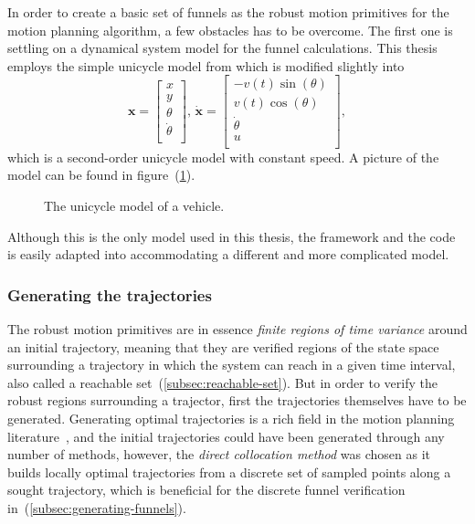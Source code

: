 In order to create a basic set of funnels as the robust motion primitives for
the \rrtfunnel{} motion planning algorithm, a few obstacles has to be overcome.
The first one is settling on a dynamical system model for the funnel
calculations. This thesis employs the simple unicycle model from
\cite[LaValle.p~613]{Lav06} which is modified slightly into
\begin{equation}
  \label{eq:model-dynamics}
  \mathbf{x} =
  \begin{bmatrix}
    x \\ y \\ \theta \\ \dot{\theta} \\
  \end{bmatrix}, \, \dot{\mathbf{x}} =
  \begin{bmatrix}
    -v(t)\sin(\theta) \\
    v(t)\cos(\theta) \\
    \dot{\theta} \\
    u \\
  \end{bmatrix},
\end{equation}
which is a second-order unicycle model with constant speed. A picture of the
model can be found in figure~(\ref{fig:second-order-unicycle}).
\begin{figure}
  \centering {}
  \caption{The unicycle model of a vehicle.}
  \label{fig:second-order-unicycle}
\end{figure}
Although this is the only model used in this thesis, the framework and the code
is easily adapted into accommodating a different and more complicated model.

\subsubsection{Generating the trajectories}

The robust motion primitives are in essence \textit{finite regions of time
  variance} around an initial trajectory, meaning that they are verified regions
of the state space surrounding a trajectory in which the system can reach in a
given time interval, also called a reachable set~(\ref{subsec:reachable-set}).
But in order to verify the robust regions surrounding a trajector, first the
trajectories themselves have to be generated. Generating optimal trajectories is
a rich field in the motion planning
literature~\cite{bettsSurveyNumericalMethods}, and the initial trajectories
could have been generated through any number of methods, however, the
\textit{direct collocation method} was chosen as it builds locally optimal
trajectories from a discrete set of sampled points along a sought trajectory,
which is beneficial for the discrete funnel verification
in~(\ref{subsec:generating-funnels}).

